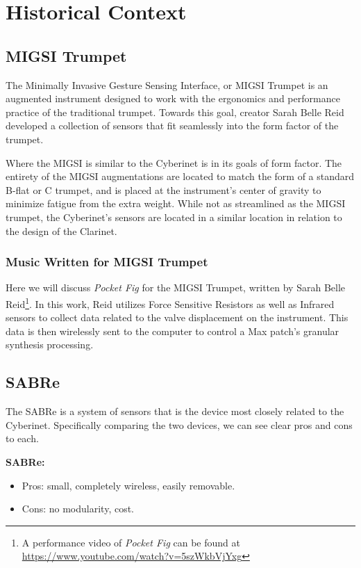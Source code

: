 \chapter{Historical Context}

\section{MIGSI Trumpet}
The Minimally Invasive Gesture Sensing Interface, or MIGSI Trumpet is an augmented instrument designed to work with the ergonomics and performance practice of the traditional trumpet\cite{reid2016}. Towards this goal, creator Sarah Belle Reid developed a collection of sensors that fit seamlessly into the form factor of the trumpet.

Where the MIGSI is similar to the Cyberinet is in its goals of form factor. The entirety of the MIGSI augmentations are located to match the form of a standard B-flat or C trumpet, and is placed at the instrument's center of gravity to minimize fatigue from the extra weight. While not as streamlined as the MIGSI trumpet, the Cyberinet's sensors are located in a similar location in relation to the design of the Clarinet.

\subsection{Music Written for MIGSI Trumpet}

Here we will discuss \textit{Pocket Fig} for the MIGSI Trumpet, written by Sarah Belle Reid\footnote{A performance video of \textit{Pocket Fig} can be found at \url{https://www.youtube.com/watch?v=5szWkbVjYxg}}. In this work, Reid utilizes Force Sensitive Resistors as well as Infrared sensors to collect data related to the valve displacement on the instrument. This data is then wirelessly sent to the computer to control a Max patch's granular synthesis processing.

\section{SABRe}
The SABRe is a system of sensors that is the device most closely related to the Cyberinet. Specifically comparing the two devices, we can see clear pros and cons to each.

\textbf{SABRe:}

\begin{itemize}
    \item Pros: small, completely wireless, easily removable.
    \item Cons: no modularity, cost.
\end{itemize}

